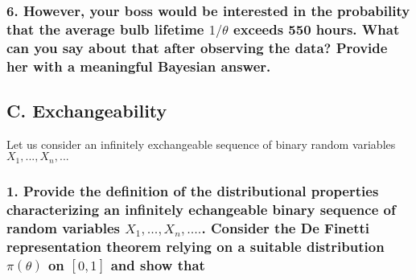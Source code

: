 \documentclass[
]{article}
\begin{document}
\hypertarget{however-your-boss-would-be-interested-in-the-probability-that-the-average-bulb-lifetime-1theta-exceeds-550-hours.-what-can-you-say-about-that-after-observing-the-data-provide-her-with-a-meaningful-bayesian-answer.}{%
\subsubsection{\texorpdfstring{6. However, your boss would be interested
in the probability that the average bulb lifetime \(1/\theta\) exceeds
550 hours. What can you say about that after observing the data? Provide
her with a meaningful Bayesian
answer.}{6. However, your boss would be interested in the probability that the average bulb lifetime 1/\textbackslash theta exceeds 550 hours. What can you say about that after observing the data? Provide her with a meaningful Bayesian answer.}}\label{however-your-boss-would-be-interested-in-the-probability-that-the-average-bulb-lifetime-1theta-exceeds-550-hours.-what-can-you-say-about-that-after-observing-the-data-provide-her-with-a-meaningful-bayesian-answer.}}

\newpage

\hypertarget{c.-exchangeability}{%
\subsection{C. Exchangeability}\label{c.-exchangeability}}

Let us consider an infinitely exchangeable sequence of binary random
variables \(X_1,...,X_n,...\)

\hypertarget{provide-the-definition-of-the-distributional-properties-characterizing-an-infinitely-echangeable-binary-sequence-of-random-variables-x_1-...x_n-.....-consider-the-de-finetti-representation-theorem-relying-on-a-suitable-distribution-pitheta-on-01-and-show-that}{%
\subsubsection{\texorpdfstring{1. Provide the definition of the
distributional properties characterizing an infinitely echangeable
binary sequence of random variables \(X_1, ...,X_n, ....\). Consider the
De Finetti representation theorem relying on a suitable distribution
\(\pi(\theta)\) on \([0,1]\) and show
that}{1. Provide the definition of the distributional properties characterizing an infinitely echangeable binary sequence of random variables X\_1, ...,X\_n, ..... Consider the De Finetti representation theorem relying on a suitable distribution \textbackslash pi(\textbackslash theta) on {[}0,1{]} and show that}}\label{provide-the-definition-of-the-distributional-properties-characterizing-an-infinitely-echangeable-binary-sequence-of-random-variables-x_1-...x_n-.....-consider-the-de-finetti-representation-theorem-relying-on-a-suitable-distribution-pitheta-on-01-and-show-that}}
\end{document}
